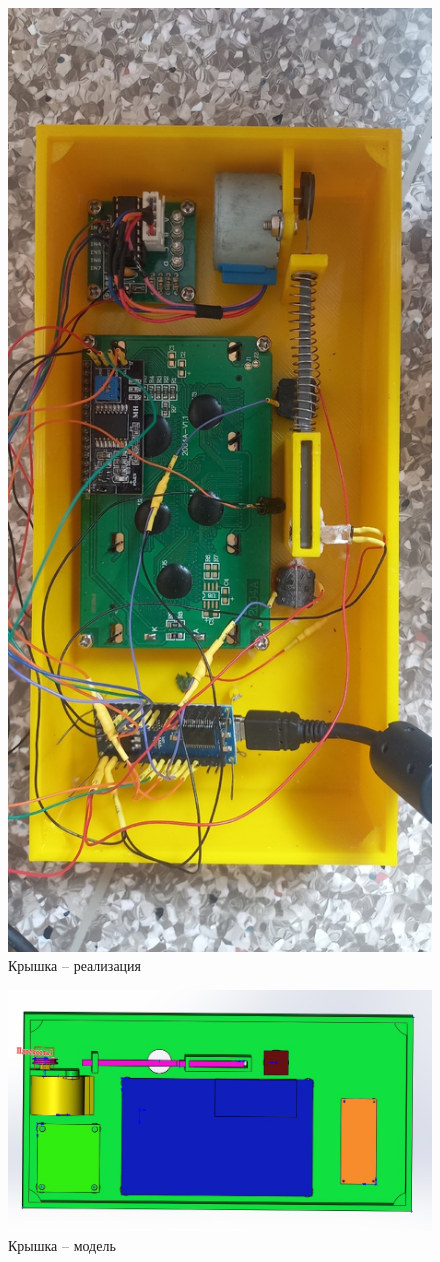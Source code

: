 \begin{figure}[H]
	\centering
	\includegraphics[width=12cm]{kryshka_real.jpg}
	\caption{Крышка -- реализация}
	\label{ris:kryshka_real}
\end{figure}
\par\medskip

\begin{figure}[H]
	\centering
	\includegraphics[width=12cm]{kryshka_model.jpg}
	\caption{Крышка -- модель}
	\label{ris:kryshka_model}
\end{figure}
\par\medskip